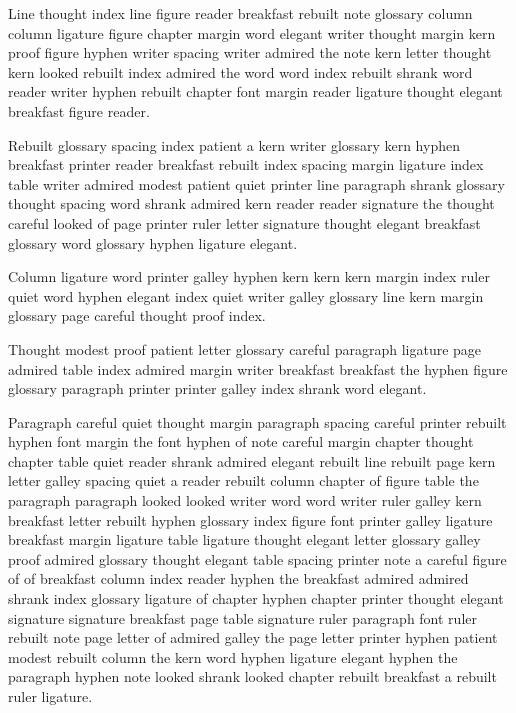 Line thought index line figure reader breakfast rebuilt note glossary column column ligature figure chapter margin word elegant writer thought margin kern proof figure hyphen writer spacing writer admired the note kern letter thought kern looked rebuilt index admired the word word index rebuilt shrank word reader writer hyphen rebuilt chapter font margin reader ligature thought elegant breakfast figure reader.

Rebuilt glossary spacing index patient a kern writer glossary kern hyphen breakfast printer reader breakfast rebuilt index spacing margin ligature index table writer admired modest patient quiet printer line paragraph shrank glossary thought spacing word shrank admired kern reader reader signature the thought careful looked of page printer ruler letter signature thought elegant breakfast glossary word glossary hyphen ligature elegant.

Column ligature word printer galley hyphen kern kern kern margin index ruler quiet word hyphen elegant index quiet writer galley glossary line kern margin glossary page careful thought proof index.

Thought modest proof patient letter glossary careful paragraph ligature page admired table index admired margin writer breakfast breakfast the hyphen figure glossary paragraph printer printer galley index shrank word elegant.

Paragraph careful quiet thought margin paragraph spacing careful printer rebuilt hyphen font margin the font hyphen of note careful margin chapter thought chapter table quiet reader shrank admired elegant rebuilt line rebuilt page kern letter galley spacing quiet a reader rebuilt column chapter of figure table the paragraph paragraph looked looked writer word word writer ruler galley kern breakfast letter rebuilt hyphen glossary index figure font printer galley ligature breakfast margin ligature table ligature thought elegant letter glossary galley proof admired glossary thought elegant table spacing printer note a careful figure of of breakfast column index reader hyphen the breakfast admired admired shrank index glossary ligature of chapter hyphen chapter printer thought elegant signature signature breakfast page table signature ruler paragraph font ruler rebuilt note page letter of admired galley the page letter printer hyphen patient modest rebuilt column the kern word hyphen ligature elegant hyphen the paragraph hyphen note looked shrank looked chapter rebuilt breakfast a rebuilt ruler ligature.

